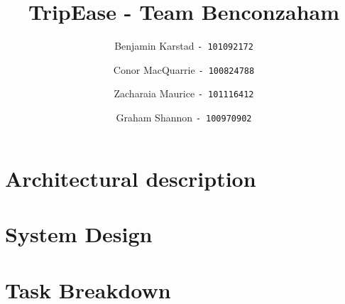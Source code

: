 \documentclass[12pt]{article}
\title{TripEase - Team Benconzaham}
\author{
Benjamin Karstad
\texttt{- 101092172}
\and
Conor MacQuarrie
\texttt{- 100824788}
\and
Zacharaia Maurice
\texttt{- 101116412}
\and
Graham Shannon
\texttt{- 100970902}
}
\begin{document}
	\maketitle
	\pagebreak
	\section*{Architectural description}
	\pagebreak
	\section*{System Design}
	\pagebreak
	\section*{Task Breakdown}
\end{document}
